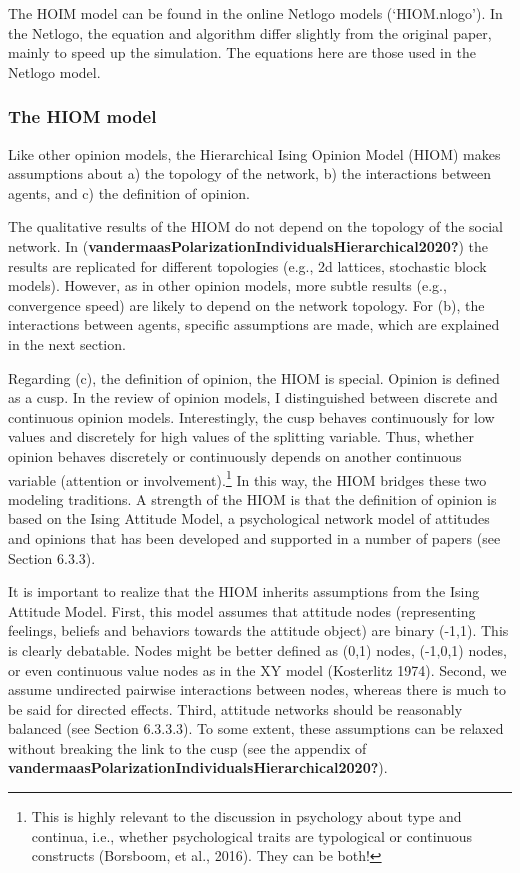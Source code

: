 \documentclass[
  letterpaper,
]{scrbook}
\begin{document}
The HOIM model can be found in the online Netlogo models (`HIOM.nlogo').
In the Netlogo, the equation and algorithm differ slightly from the
original paper, mainly to speed up the simulation. The equations here
are those used in the Netlogo model.

\hypertarget{the-hiom-model}{%
\subsubsection{The HIOM model}\label{the-hiom-model}}

Like other opinion models, the Hierarchical Ising Opinion Model (HIOM)
makes assumptions about a) the topology of the network, b) the
interactions between agents, and c) the definition of opinion.

The qualitative results of the HIOM do not depend on the topology of the
social network. In
(\textbf{vandermaasPolarizationIndividualsHierarchical2020?}) the
results are replicated for different topologies (e.g., 2d lattices,
stochastic block models). However, as in other opinion models, more
subtle results (e.g., convergence speed) are likely to depend on the
network topology. For (b), the interactions between agents, specific
assumptions are made, which are explained in the next section.

Regarding (c), the definition of opinion, the HIOM is special. Opinion
is defined as a cusp. In the review of opinion models, I distinguished
between discrete and continuous opinion models. Interestingly, the cusp
behaves continuously for low values and discretely for high values of
the splitting variable. Thus, whether opinion behaves discretely or
continuously depends on another continuous variable (attention or
involvement).\footnote{This is highly relevant to the discussion in
  psychology about type and continua, i.e., whether psychological traits
  are typological or continuous constructs (Borsboom, et al., 2016).
  They can be both!} In this way, the HIOM bridges these two modeling
traditions. A strength of the HIOM is that the definition of opinion is
based on the Ising Attitude Model, a psychological network model of
attitudes and opinions that has been developed and supported in a number
of papers (see Section 6.3.3).

It is important to realize that the HIOM inherits assumptions from the
Ising Attitude Model. First, this model assumes that attitude nodes
(representing feelings, beliefs and behaviors towards the attitude
object) are binary (-1,1). This is clearly debatable. Nodes might be
better defined as (0,1) nodes, (-1,0,1) nodes, or even continuous value
nodes as in the XY model (Kosterlitz 1974). Second, we assume undirected
pairwise interactions between nodes, whereas there is much to be said
for directed effects. Third, attitude networks should be reasonably
balanced (see Section 6.3.3.3). To some extent, these assumptions can be
relaxed without breaking the link to the cusp (see the appendix of
\textbf{vandermaasPolarizationIndividualsHierarchical2020?}).
\end{document}

